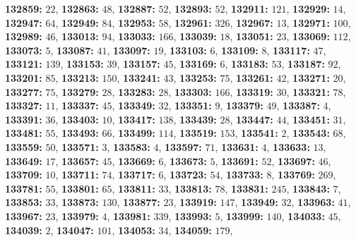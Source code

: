 \textsf{\bfseries 132859:} $22$, \textsf{\bfseries 132863:} $48$, \textsf{\bfseries 132887:} $52$, \textsf{\bfseries 132893:} $52$, \textsf{\bfseries 132911:} $121$, \textsf{\bfseries 132929:} $14$, \textsf{\bfseries 132947:} $64$, \textsf{\bfseries 132949:} $84$, \textsf{\bfseries 132953:} $58$, \textsf{\bfseries 132961:} $326$, \textsf{\bfseries 132967:} $13$, \textsf{\bfseries 132971:} $100$, \textsf{\bfseries 132989:} $46$, \textsf{\bfseries 133013:} $94$, \textsf{\bfseries 133033:} $166$, \textsf{\bfseries 133039:} $18$, \textsf{\bfseries 133051:} $23$, \textsf{\bfseries 133069:} $112$, \textsf{\bfseries 133073:} $5$, \textsf{\bfseries 133087:} $41$, \textsf{\bfseries 133097:} $19$, \textsf{\bfseries 133103:} $6$, \textsf{\bfseries 133109:} $8$, \textsf{\bfseries 133117:} $47$, \textsf{\bfseries 133121:} $139$, \textsf{\bfseries 133153:} $39$, \textsf{\bfseries 133157:} $45$, \textsf{\bfseries 133169:} $6$, \textsf{\bfseries 133183:} $53$, \textsf{\bfseries 133187:} $92$, \textsf{\bfseries 133201:} $85$, \textsf{\bfseries 133213:} $150$, \textsf{\bfseries 133241:} $43$, \textsf{\bfseries 133253:} $75$, \textsf{\bfseries 133261:} $42$, \textsf{\bfseries 133271:} $20$, \textsf{\bfseries 133277:} $75$, \textsf{\bfseries 133279:} $28$, \textsf{\bfseries 133283:} $28$, \textsf{\bfseries 133303:} $166$, \textsf{\bfseries 133319:} $30$, \textsf{\bfseries 133321:} $78$, \textsf{\bfseries 133327:} $11$, \textsf{\bfseries 133337:} $45$, \textsf{\bfseries 133349:} $32$, \textsf{\bfseries 133351:} $9$, \textsf{\bfseries 133379:} $49$, \textsf{\bfseries 133387:} $4$, \textsf{\bfseries 133391:} $36$, \textsf{\bfseries 133403:} $10$, \textsf{\bfseries 133417:} $138$, \textsf{\bfseries 133439:} $28$, \textsf{\bfseries 133447:} $44$, \textsf{\bfseries 133451:} $31$, \textsf{\bfseries 133481:} $55$, \textsf{\bfseries 133493:} $66$, \textsf{\bfseries 133499:} $114$, \textsf{\bfseries 133519:} $153$, \textsf{\bfseries 133541:} $2$, \textsf{\bfseries 133543:} $68$, \textsf{\bfseries 133559:} $50$, \textsf{\bfseries 133571:} $3$, \textsf{\bfseries 133583:} $4$, \textsf{\bfseries 133597:} $71$, \textsf{\bfseries 133631:} $4$, \textsf{\bfseries 133633:} $13$, \textsf{\bfseries 133649:} $17$, \textsf{\bfseries 133657:} $45$, \textsf{\bfseries 133669:} $6$, \textsf{\bfseries 133673:} $5$, \textsf{\bfseries 133691:} $52$, \textsf{\bfseries 133697:} $46$, \textsf{\bfseries 133709:} $10$, \textsf{\bfseries 133711:} $74$, \textsf{\bfseries 133717:} $6$, \textsf{\bfseries 133723:} $54$, \textsf{\bfseries 133733:} $8$, \textsf{\bfseries 133769:} $269$, \textsf{\bfseries 133781:} $55$, \textsf{\bfseries 133801:} $65$, \textsf{\bfseries 133811:} $33$, \textsf{\bfseries 133813:} $78$, \textsf{\bfseries 133831:} $245$, \textsf{\bfseries 133843:} $7$, \textsf{\bfseries 133853:} $33$, \textsf{\bfseries 133873:} $130$, \textsf{\bfseries 133877:} $23$, \textsf{\bfseries 133919:} $147$, \textsf{\bfseries 133949:} $32$, \textsf{\bfseries 133963:} $41$, \textsf{\bfseries 133967:} $23$, \textsf{\bfseries 133979:} $4$, \textsf{\bfseries 133981:} $339$, \textsf{\bfseries 133993:} $5$, \textsf{\bfseries 133999:} $140$, \textsf{\bfseries 134033:} $45$, \textsf{\bfseries 134039:} $2$, \textsf{\bfseries 134047:} $101$, \textsf{\bfseries 134053:} $34$, \textsf{\bfseries 134059:} $179$, 
